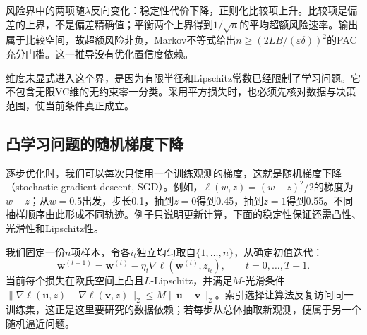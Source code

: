 风险界中的两项随$\lambda$反向变化：稳定性代价下降，正则化比较项上升。比较项是偏差的上界，不是偏差精确值；平衡两个上界得到$1/\sqrt n$的平均超额风险速率。输出属于比较空间，故超额风险非负，Markov不等式给出$n\geq(2LB/(\varepsilon\delta))^2$的PAC充分门槛。这一推导没有优化置信度依赖。

维度未显式进入这个界，是因为有限半径和Lipschitz常数已经限制了学习问题。它不包含无限VC维的无约束零一分类。采用平方损失时，也必须先核对数据与决策范围，使当前条件真正成立。

\subsection{凸学习问题的随机梯度下降}
\label{sec:sgd-stability}

逐步优化时，我们可以每次只使用一个训练观测的梯度，这就是随机梯度下降（stochastic gradient descent, SGD）。例如，$\ell(w,z)=(w-z)^2/2$的梯度为$w-z$；从$w=0.5$出发，步长0.1，抽到$z=0$得到0.45，抽到$z=1$得到0.55。不同抽样顺序由此形成不同轨迹。例子只说明更新计算，下面的稳定性保证还需凸性、光滑性和Lipschitz性。

我们固定一份$n$项样本，令各$i_t$独立均匀取自$\{1,\ldots,n\}$，从确定初值迭代：
\begin{equation}
 \bm w^{(t+1)}=\bm w^{(t)}-\eta_t\nabla\ell(\bm w^{(t)},z_{i_t}),
 \qquad t=0,\ldots,T-1.
 \label{eq:sgd-update}
\end{equation}
当前每个损失在欧氏空间上凸且$L$-Lipschitz，并满足$M$-光滑条件$\|\nabla\ell(\bm u,z)-\nabla\ell(\bm v,z)\|_2\leq M\|\bm u-\bm v\|_2$。索引选择让算法反复访问同一训练集，这正是这里要研究的数据依赖；若每步从总体抽取新观测，便属于另一个随机逼近问题。

